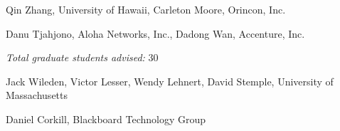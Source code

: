 \documentclass[11pt]{article}
\begin{document}
\begin{Thesis Advisor and Postgraduate-Scholar Sponsor}
\item Qin Zhang, University of Hawaii, Carleton Moore, Orincon, Inc.
\item Danu Tjahjono, Aloha Networks, Inc., Dadong Wan, Accenture, Inc.

\item {\em Total graduate students advised:} 30

\end{Thesis Advisor and Postgraduate-Scholar Sponsor}

\begin{Graduate and Postdoctoral Advisors}
\item Jack Wileden, 
      Victor Lesser, 
      Wendy Lehnert, 
       David Stemple, University of Massachusetts
\item Daniel Corkill, Blackboard Technology Group
\end{Graduate and Postdoctoral Advisors}
\end{document}

